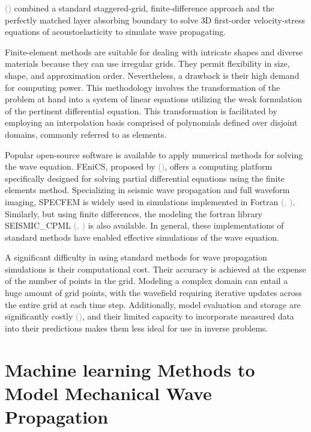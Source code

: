 \documentclass[11pt,twoside]{article}
\renewcommand{\citep}[2][]{\textcolor{gray}{(\citeauthor{#2}, \citeyear[#1]{#2})}}
\renewcommand{\citeauthoryear}[2][]{\textcolor{gray}{\citeauthor{#2} (\textcolor{gray}{\citeyear[#1]{#2}})}}
\begin{document}
\citeauthoryear{liu_simulation_2023} combined a standard staggered-grid, finite-difference approach and the perfectly matched layer absorbing boundary to solve 3D first-order velocity-stress equations of acoustoelasticity to simulate wave propagating.

Finite-element methods are suitable for dealing with intricate shapes and diverse materials because they can use irregular grids. They permit flexibility in size, shape, and approximation order. Nevertheless, a drawback is their high demand for computing power. This methodology involves the transformation of the problem at hand into a system of linear equations utilizing the weak formulation of the pertinent differential equation. This transformation is facilitated by employing an interpolation basis comprised of polynomials defined over disjoint domains, commonly referred to as elements.

Popular open-source software is available to apply numerical methods for solving the wave equation. FEniCS, proposed by \citeauthoryear{FEniCS}, offers a computing platform specifically designed for solving partial differential equations using the finite elements method. Specializing in seismic wave propagation and full waveform imaging, SPECFEM is widely used in simulations implemented in Fortran \citep{dimitri_komatitsch_2023_10415228,komatitsch_2024_10823181}. Similarly, but using finite differences, the modeling the fortran library SEISMIC\_CPML \citep{komatitsch_unsplit_2007} is also available. In general, these implementations of standard methods have enabled effective simulations of the wave equation. 

A significant difficulty in using standard methods for wave propagation simulations is their computational cost. Their accuracy is achieved at the expense of the number of points in the grid. Modeling a complex domain can entail a huge amount of grid points, with the wavefield requiring iterative updates across the entire grid at each time step. Additionally, model evaluation and storage are significantly costly \citeauthoryear{saloma_computational_1993}, and their limited capacity to incorporate measured data into their predictions makes them less ideal for use in inverse problems.

\section{Machine learning Methods to Model Mechanical Wave Propagation}\label{sec:dl_mwpm}
\end{document}
